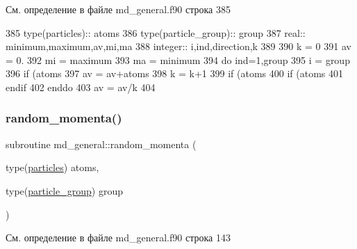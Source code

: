 См. определение в файле md\+\_\+general.\+f90 строка 385


\begin{DoxyCode}
385     \textcolor{keywordtype}{type}(particles)::   atoms
386     \textcolor{keywordtype}{type}(particle\_group):: group
387     \textcolor{keywordtype}{real}:: minimum,maximum,av,mi,ma
388     \textcolor{keywordtype}{integer}::       i,ind,direction,k
389     
390     k = 0
391     av = 0.
392     mi = maximum
393     ma = minimum
394     \textcolor{keywordflow}{do} ind=1,group%
395         i = group%
396         \textcolor{keywordflow}{if} (atoms%
397             av = av+atoms%
398             k = k+1
399             \textcolor{keywordflow}{if} (atoms%
400             \textcolor{keywordflow}{if} (atoms%
401 \textcolor{keywordflow}{        endif}
402 \textcolor{keywordflow}{    enddo}
403     av = av/k
404     
\end{DoxyCode}
\mbox{\label{namespacemd__general_a8192b37ec3462b5fcb7fabf17c8eb658}} 
\subsubsection{\texorpdfstring{random\+\_\+momenta()}{random\_momenta()}}
{\footnotesize\ttfamily subroutine md\+\_\+general\+::random\+\_\+momenta (\begin{DoxyParamCaption}\item[{type(\mbox{\hyperlink{structmd__general_1_1particles}{particles}})}]{atoms,  }\item[{type(\mbox{\hyperlink{structmd__general_1_1particle__group}{particle\+\_\+group}})}]{group }\end{DoxyParamCaption})}



См. определение в файле md\+\_\+general.\+f90 строка 143


